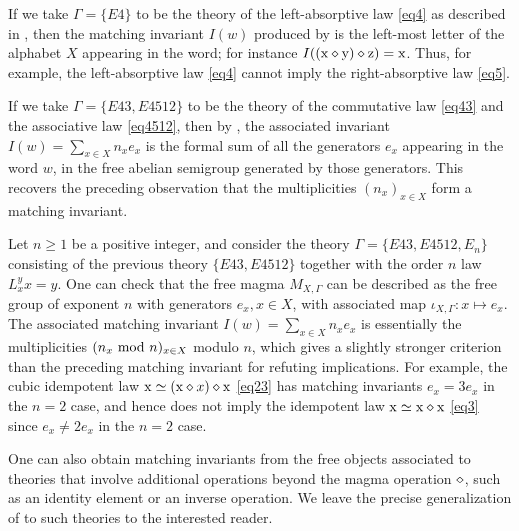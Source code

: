 \begin{example}  If we take $\Gamma = \{E4\}$ to be the theory of the left-absorptive law \eqref{eq4} as described in , then the matching invariant $I(w)$ produced by  is the left-most letter of the alphabet $X$ appearing in the word; for instance $I((\mathrm{x} \diamond \mathrm{y}) \diamond \mathrm{z}) = \mathrm{x}$.  Thus, for example, the left-absorptive law \eqref{eq4} cannot imply the right-absorptive law \eqref{eq5}.
\end{example}

\begin{example}  If we take $\Gamma = \{E43, E4512\}$ to be the theory of the commutative law \eqref{eq43} and the associative law \eqref{eq4512}, then by , the associated invariant $I(w) = \sum_{x \in X} n_x e_x$ is the formal sum of all the generators $e_x$ appearing in the word $w$, in the free abelian semigroup generated by those generators.  This recovers the preceding observation that the multiplicities $(n_x)_{x \in X}$ form a matching invariant.
\end{example}

\begin{example}  Let $n \geq 1$ be a positive integer, and consider the theory $\Gamma = \{E43, E4512, E_n\}$ consisting of the previous theory $\{E43, E4512\}$ together with the order $n$ law $L_x^y x = y$.  One can check that the free magma $M_{X,\Gamma}$ can be described as the free group of exponent $n$ with generators $e_x, x \in X$, with associated map $\iota_{X,\Gamma} \colon x \mapsto e_x$.  The associated matching invariant $I(w) = \sum_{x \in X} n_x e_x$ is essentially the multiplicities $(n_x \hbox{ mod } n)_{x \in X}$ modulo $n$, which gives a slightly stronger criterion than the preceding matching invariant for refuting implications.  For example, the cubic idempotent law $\mathrm{x} \simeq (\mathrm{x} \diamond x) \diamond \mathrm{x}$ \eqref{eq23}
has matching invariants $e_x = 3e_x$ in the $n=2$ case, and hence does not imply the idempotent law $\mathrm{x} \simeq \mathrm{x} \diamond \mathrm{x}$ \eqref{eq3} since $e_x \neq 2e_x$ in the $n=2$ case.
\end{example}


\begin{remark}  One can also obtain matching invariants from the free objects associated to theories that involve additional operations beyond the magma operation $\diamond$, such as an identity element or an inverse operation.  We leave the precise generalization of  to such theories to the interested reader.
\end{remark}

